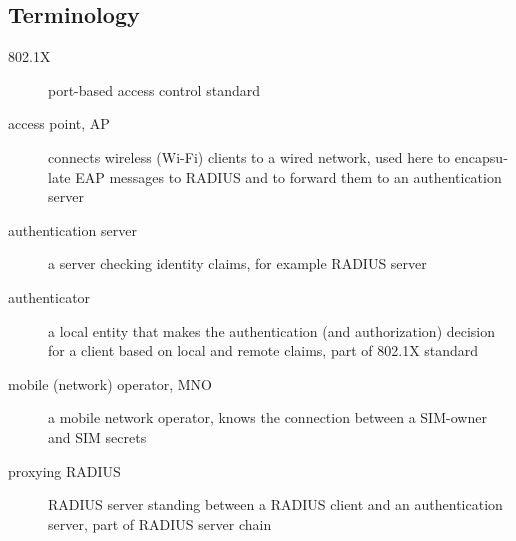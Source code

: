 \documentclass[12pt,a4paper,english]{tutthesis}
\begin{document}
\begin{otherlanguage}{english}
\newpage
\chapter*{Terminology}
\markboth{}{}                                %


\begin{description}
\item[{802.1X}] port-based access control standard
\item[{access point, AP}] connects wireless (Wi-Fi) clients to a wired network,
used here to encapsulate EAP messages to RADIUS and
to forward them to an authentication server
\end{description}
\begin{description}
\item[{authentication server}] a server checking identity claims, for
example RADIUS server
\item[{authenticator}] a local entity that makes the authentication (and
authorization) decision for a client based on local and remote
claims, part of 802.1X standard
\end{description}
\begin{description}
\item[{mobile (network) operator, MNO}] a mobile network operator, knows the connection
between a SIM-owner and SIM secrets
\end{description}
\begin{description}
\item[{proxying RADIUS}] RADIUS server standing between a RADIUS
client and an authentication server, part of RADIUS server chain
\end{description}



\if@twoside
\cleardoublepage
\fi

\newpage             %
\setcounter{page}{1} %
\renewcommand{\chaptername}{} %


\end{otherlanguage}
\end{document}
